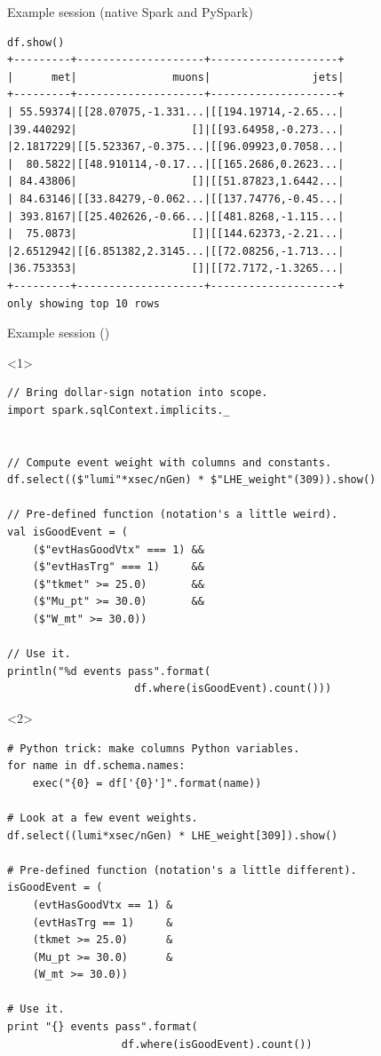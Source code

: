 \documentclass[aspectratio=169]{beamer}
\begin{document}
\begin{frame}[fragile]{Example session (native Spark and PySpark)}
\vspace{0.35 cm}
\begin{center}
\begin{minipage}{0.9\linewidth}
\small
\begin{verbatim}
df.show()
+---------+--------------------+--------------------+
|      met|               muons|                jets|
+---------+--------------------+--------------------+
| 55.59374|[[28.07075,-1.331...|[[194.19714,-2.65...|
|39.440292|                  []|[[93.64958,-0.273...|
|2.1817229|[[5.523367,-0.375...|[[96.09923,0.7058...|
|  80.5822|[[48.910114,-0.17...|[[165.2686,0.2623...|
| 84.43806|                  []|[[51.87823,1.6442...|
| 84.63146|[[33.84279,-0.062...|[[137.74776,-0.45...|
| 393.8167|[[25.402626,-0.66...|[[481.8268,-1.115...|
|  75.0873|                  []|[[144.62373,-2.21...|
|2.6512942|[[6.851382,2.3145...|[[72.08256,-1.713...|
|36.753353|                  []|[[72.7172,-1.3265...|
+---------+--------------------+--------------------+
only showing top 10 rows
\end{verbatim}
\end{minipage}
\end{center}
\end{frame}

\begin{frame}[fragile]{Example session ()}
\vspace{0.1 cm}
\small
\begin{onlyenv}<1>
\begin{verbatim}
// Bring dollar-sign notation into scope.
import spark.sqlContext.implicits._


// Compute event weight with columns and constants.
df.select(($"lumi"*xsec/nGen) * $"LHE_weight"(309)).show()

// Pre-defined function (notation's a little weird).
val isGoodEvent = (
    ($"evtHasGoodVtx" === 1) &&
    ($"evtHasTrg" === 1)     &&
    ($"tkmet" >= 25.0)       &&
    ($"Mu_pt" >= 30.0)       &&
    ($"W_mt" >= 30.0))

// Use it.
println("%d events pass".format(
                    df.where(isGoodEvent).count()))
\end{verbatim}
\end{onlyenv}\begin{onlyenv}<2>
\begin{verbatim}
# Python trick: make columns Python variables.
for name in df.schema.names:
    exec("{0} = df['{0}']".format(name))

# Look at a few event weights.
df.select((lumi*xsec/nGen) * LHE_weight[309]).show()

# Pre-defined function (notation's a little different).
isGoodEvent = (
    (evtHasGoodVtx == 1) &
    (evtHasTrg == 1)     &
    (tkmet >= 25.0)      &
    (Mu_pt >= 30.0)      &
    (W_mt >= 30.0))

# Use it.
print "{} events pass".format(
                  df.where(isGoodEvent).count())
\end{verbatim}
\end{onlyenv}
\end{frame}
\end{document}
